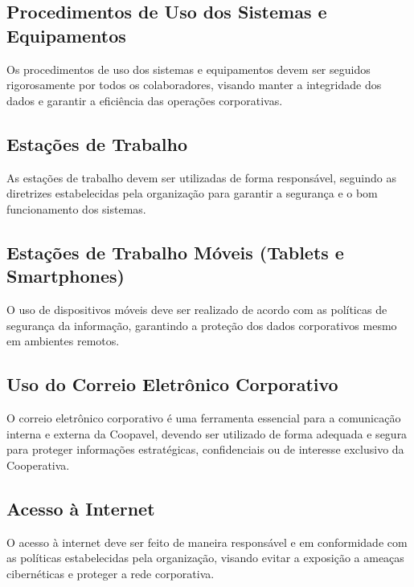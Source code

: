 \documentclass[letterpaper,10pt,brazil]{sphinxmanual}
\begin{document}
\subsection{Procedimentos de Uso dos Sistemas e Equipamentos}
\label{\detokenize{regras:procedimentos-de-uso-dos-sistemas-e-equipamentos}}
\sphinxAtStartPar
Os procedimentos de uso dos sistemas e equipamentos devem ser seguidos rigorosamente
por todos os colaboradores, visando manter a integridade dos dados e garantir a eficiência
das operações corporativas.


\subsection{Estações de Trabalho}
\label{\detokenize{regras:estacoes-de-trabalho}}
\sphinxAtStartPar
As estações de trabalho devem ser utilizadas de forma responsável, seguindo as diretrizes
estabelecidas pela organização para garantir a segurança e o bom funcionamento dos
sistemas.


\subsection{Estações de Trabalho Móveis (Tablets e Smartphones)}
\label{\detokenize{regras:estacoes-de-trabalho-moveis-tablets-e-smartphones}}
\sphinxAtStartPar
O uso de dispositivos móveis deve ser realizado de acordo com as políticas de segurança
da informação, garantindo a proteção dos dados corporativos mesmo em ambientes
remotos.


\subsection{Uso do Correio Eletrônico Corporativo}
\label{\detokenize{regras:uso-do-correio-eletronico-corporativo}}
\sphinxAtStartPar
O correio eletrônico corporativo é uma ferramenta essencial para a comunicação interna
e externa da Coopavel, devendo ser utilizado de forma adequada e segura para proteger
informações estratégicas, confidenciais ou de interesse exclusivo da Cooperativa.


\subsection{Acesso à Internet}
\label{\detokenize{regras:acesso-a-internet}}
\sphinxAtStartPar
O acesso à internet deve ser feito de maneira responsável e em conformidade com as
políticas estabelecidas pela organização, visando evitar a exposição a ameaças
cibernéticas e proteger a rede corporativa.
\end{document}
